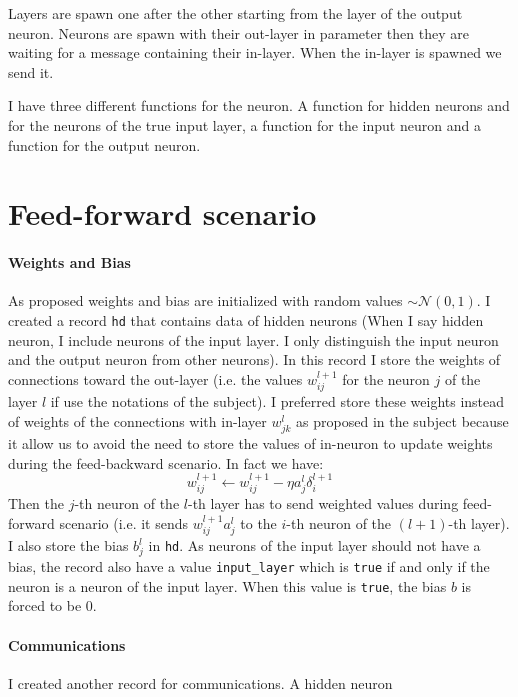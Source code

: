 \documentclass[12pt]{article}
\begin{document}
Layers are spawn one after the other starting from the layer of the output neuron. Neurons are spawn with their out-layer in parameter then they are waiting for a message containing their in-layer. When the in-layer is spawned we send it.

I have three different functions for the neuron. A function for hidden neurons and for the neurons of the true input layer, a function for the input neuron and a function for the output neuron.

\section{Feed-forward scenario}

\paragraph{Weights and Bias}
As proposed weights and bias are initialized with random values $\sim \mathcal{N}(0, 1)$. I created a record \verb|hd| that contains data of hidden neurons (When I say hidden neuron, I include neurons of the input layer. I only distinguish the input neuron and the output neuron from other neurons). In this record I store the weights of connections toward the out-layer (i.e. the values $w_{ij}^{l+1}$ for the neuron $j$ of the layer $l$ if use the notations of the subject). I preferred store these weights instead of weights of the connections with in-layer $w_{jk}^l$ as proposed in the subject because it allow us to avoid the need to store the values of in-neuron to update weights during the feed-backward scenario. In fact we have:
$$ w_{ij}^{l+1} \gets w_{ij}^{l+1} - \eta a_j^l \delta_i^{l+1} $$
Then the $j$-th neuron of the $l$-th layer has to send weighted values during feed-forward scenario (i.e. it sends $w_{ij}^{l+1} a_j^l$ to the $i$-th neuron of the $(l+1)$-th layer). I also store the bias $b_j^l$ in \verb|hd|. As neurons of the input layer should not have a bias, the record also have a value \verb|input_layer| which is \verb|true| if and only if the neuron is a neuron of the input layer. When this value is \verb|true|, the bias $b$ is forced to be 0.

\paragraph{Communications}
I created another record for communications. A hidden neuron 
\end{document}
